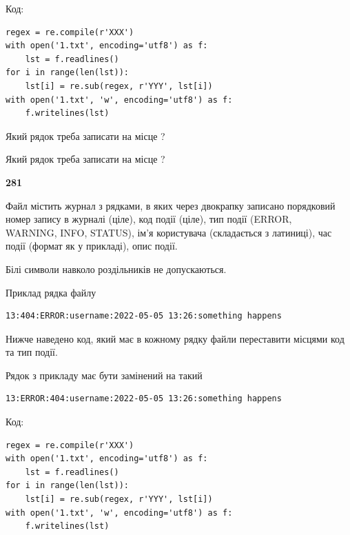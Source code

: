 Код:



\begin{verbatim}
regex = re.compile(r'XXX')
with open('1.txt', encoding='utf8') as f:
    lst = f.readlines()
for i in range(len(lst)):
    lst[i] = re.sub(regex, r'YYY', lst[i])
with open('1.txt', 'w', encoding='utf8') as f:
    f.writelines(lst)
\end{verbatim}









Який рядок треба записати на місце  ?\par
\vspace{5mm}


Який рядок треба записати на місце  ?\par


\newpage

{\begin {center}\textbf{ 281}\end {center}}\par
Файл  містить журнал з рядками, в яких через двокрапку записано поряд\-ко\-вий номер запису в журналі (ціле), код події (ціле), тип події (ERROR,\\ WARNING, INFO, STATUS), ім'я користувача (складається з латиниці), час події (фор\-мат як у прикладі), опис події.

Білі символи навколо роздільників не допускаються.

Приклад рядка файлу



\begin{verbatim}
13:404:ERROR:username:2022-05-05 13:26:something happens
\end{verbatim}


Нижче наведено код, який має в кожному рядку файли переставити місцями код та тип події.

Рядок з прикладу має бути замінений на такий



\begin{verbatim}
13:ERROR:404:username:2022-05-05 13:26:something happens
\end{verbatim}




Код:



\begin{verbatim}
regex = re.compile(r'XXX')
with open('1.txt', encoding='utf8') as f:
    lst = f.readlines()
for i in range(len(lst)):
    lst[i] = re.sub(regex, r'YYY', lst[i])
with open('1.txt', 'w', encoding='utf8') as f:
    f.writelines(lst)
\end{verbatim}







